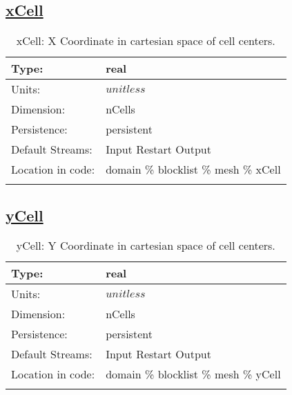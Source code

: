 \subsection[xCell]{\hyperref[sec:var_tab_mesh]{xCell}}
\label{subsec:var_sec_mesh_xCell}
\begin{center}
\begin{longtable}{| p{2.0in} | p{4.0in} |}
        \hline 
        Type: & real \\
        \hline 
        Units: & $unitless$ \\
        \hline 
        Dimension: & nCells \\
        \hline 
        Persistence: & persistent \\
        \hline 
		 Default Streams: & Input Restart Output  \\
        \hline 
		 Location in code: & domain \% blocklist \% mesh \% xCell \\
		 \hline 
    \caption{xCell: X Coordinate in cartesian space of cell centers.}
\end{longtable}
\end{center}
\subsection[yCell]{\hyperref[sec:var_tab_mesh]{yCell}}
\label{subsec:var_sec_mesh_yCell}
\begin{center}
\begin{longtable}{| p{2.0in} | p{4.0in} |}
        \hline 
        Type: & real \\
        \hline 
        Units: & $unitless$ \\
        \hline 
        Dimension: & nCells \\
        \hline 
        Persistence: & persistent \\
        \hline 
		 Default Streams: & Input Restart Output  \\
        \hline 
		 Location in code: & domain \% blocklist \% mesh \% yCell \\
		 \hline 
    \caption{yCell: Y Coordinate in cartesian space of cell centers.}
\end{longtable}
\end{center}
